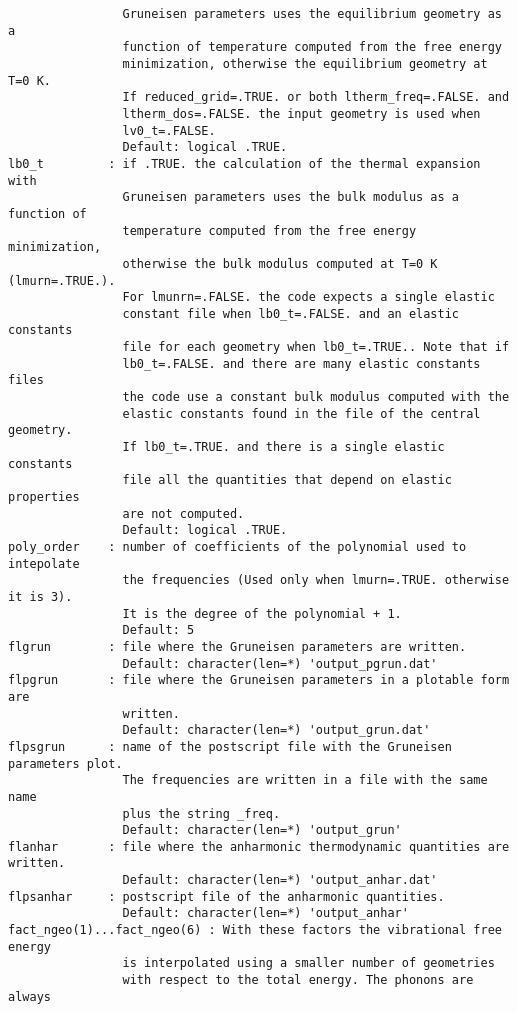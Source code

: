 \documentclass[12pt,a4paper]{article}
\begin{document}
\begin{verbatim}
                Gruneisen parameters uses the equilibrium geometry as a 
                function of temperature computed from the free energy 
                minimization, otherwise the equilibrium geometry at T=0 K. 
                If reduced_grid=.TRUE. or both ltherm_freq=.FALSE. and 
                ltherm_dos=.FALSE. the input geometry is used when 
                lv0_t=.FALSE.
                Default: logical .TRUE.
lb0_t         : if .TRUE. the calculation of the thermal expansion with 
                Gruneisen parameters uses the bulk modulus as a function of 
                temperature computed from the free energy minimization, 
                otherwise the bulk modulus computed at T=0 K (lmurn=.TRUE.). 
                For lmunrn=.FALSE. the code expects a single elastic 
                constant file when lb0_t=.FALSE. and an elastic constants
                file for each geometry when lb0_t=.TRUE.. Note that if
                lb0_t=.FALSE. and there are many elastic constants files
                the code use a constant bulk modulus computed with the
                elastic constants found in the file of the central geometry. 
                If lb0_t=.TRUE. and there is a single elastic constants 
                file all the quantities that depend on elastic properties 
                are not computed.
                Default: logical .TRUE.
poly_order    : number of coefficients of the polynomial used to intepolate 
                the frequencies (Used only when lmurn=.TRUE. otherwise it is 3).
                It is the degree of the polynomial + 1.
                Default: 5
flgrun        : file where the Gruneisen parameters are written. 
                Default: character(len=*) 'output_pgrun.dat'
flpgrun       : file where the Gruneisen parameters in a plotable form are
                written.
                Default: character(len=*) 'output_grun.dat'
flpsgrun      : name of the postscript file with the Gruneisen parameters plot.
                The frequencies are written in a file with the same name 
                plus the string _freq.
                Default: character(len=*) 'output_grun'
flanhar       : file where the anharmonic thermodynamic quantities are written.
                Default: character(len=*) 'output_anhar.dat'
flpsanhar     : postscript file of the anharmonic quantities.
                Default: character(len=*) 'output_anhar'
fact_ngeo(1)...fact_ngeo(6) : With these factors the vibrational free energy 
                is interpolated using a smaller number of geometries 
                with respect to the total energy. The phonons are always 

\end{verbatim}
\end{document}
